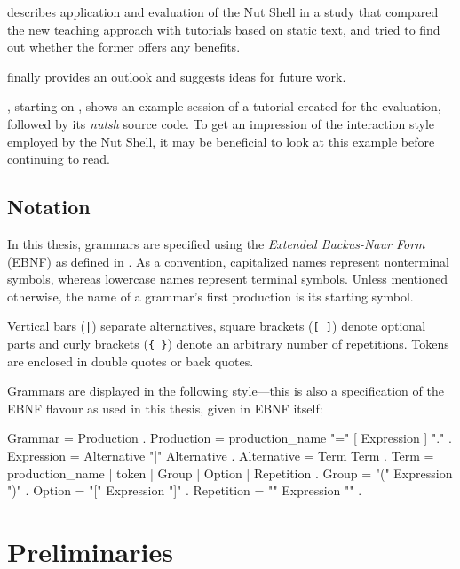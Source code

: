 \documentclass[paper=a4,twoside,abstract=on,cleardoublepage=empty,numbers=noenddot,toc=bib,toc=listof,12pt,appendixprefix=true]{scrreprt}
\begin{document}
 describes application and evaluation of the Nut Shell in a study that compared the new teaching approach with tutorials based on static text, and tried to find out whether the former offers any benefits.

 finally provides an outlook and suggests ideas for future work.


, starting on , shows an example session of a tutorial created for the evaluation, followed by its \emph{nutsh} source code. To get an impression of the interaction style employed by the Nut Shell, it may be beneficial to look at this example before continuing to read.

\section{Notation}
\label{sec:ebnf}

In this thesis, grammars are specified using the \emph{Extended Backus-Naur Form} (EBNF) as defined in \cite{wirth77}. As a convention, capitalized names represent nonterminal symbols, whereas lowercase names represent terminal symbols. Unless mentioned otherwise, the name of a grammar's first production is its starting symbol.

Vertical bars (\texttt{|}) separate alternatives, square brackets (\texttt{[ ]}) denote optional parts and curly brackets (\texttt{\{ \}}) denote an arbitrary number of repetitions. Tokens are enclosed in double quotes or back quotes.

Grammars are displayed in the following style---this is also a specification of the EBNF flavour as used in this thesis, given in EBNF itself:

\begin{ebnf}
Grammar     = { Production } .
Production  = production_name "=" [ Expression ] "." .
Expression  = Alternative { "|" Alternative } .
Alternative = Term { Term } .
Term        = production_name | token | Group | Option | Repetition .
Group       = "(" Expression ")" .
Option      = "[" Expression "]" .
Repetition  = "{" Expression "}" .
\end{ebnf}

\chapter{Preliminaries}
\label{sec:preliminaries}
\end{document}
